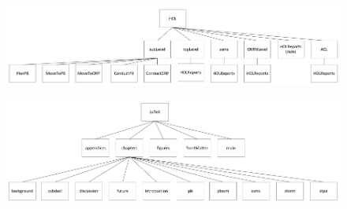 \documentclass[hidelinks,12pt,a4paper]{report}
\begin{document}
\begin{appendices}
\begin{figure}[t]
\includegraphics[width=\textwidth]{../figures/holFolders}
\end{figure}

\begin{figure}[t]
\includegraphics[width=\textwidth]{../figures/latexFolders}
\end{figure}

\end{appendices}\cleardoublepage

%
%




\doublespacing
\end{document}
